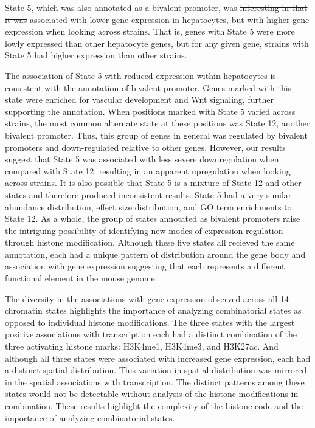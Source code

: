 \documentclass[
  11pt,
]{article}
\providecommand{\DIFaddtex}[1]{{\protect\color{blue}\uwave{#1}}} %
\providecommand{\DIFdeltex}[1]{{\protect\color{red}\sout{#1}}}                      %
\providecommand{\DIFaddbegin}{} %
\providecommand{\DIFaddend}{} %
\providecommand{\DIFdelbegin}{} %
\providecommand{\DIFdelend}{} %
\providecommand{\DIFadd}[1]{\texorpdfstring{\DIFaddtex{#1}}{#1}} %
\providecommand{\DIFdel}[1]{\texorpdfstring{\DIFdeltex{#1}}{}} %
\newcommand{\DIFscaledelfig}{0.5}
\newlength{\DIFdelgraphicswidth} %
\newlength{\DIFdelgraphicsheight} %
\newcommand{\DIFaddincludegraphics}[2][]{{\color{blue}\fbox{\DIFOincludegraphics[#1]{#2}}}} %
\newcommand{\DIFdelincludegraphics}[2][]{%
\sbox{\DIFdelgraphicsbox}{\DIFOincludegraphics[#1]{#2}}%
\settoboxwidth{\DIFdelgraphicswidth}{\DIFdelgraphicsbox} %
\settoboxtotalheight{\DIFdelgraphicsheight}{\DIFdelgraphicsbox} %
\scalebox{\DIFscaledelfig}{%
\parbox[b]{\DIFdelgraphicswidth}{\usebox{\DIFdelgraphicsbox}\\[-\baselineskip] \rule{\DIFdelgraphicswidth}{0em}}\llap{\resizebox{\DIFdelgraphicswidth}{\DIFdelgraphicsheight}{%
\setlength{\unitlength}{\DIFdelgraphicswidth}%
\begin{picture}(1,1)%
\thicklines\linethickness{2pt} %
{\color[rgb]{1,0,0}\put(0,0){\framebox(1,1){}}}%
{\color[rgb]{1,0,0}\put(0,0){\line( 1,1){1}}}%
{\color[rgb]{1,0,0}\put(0,1){\line(1,-1){1}}}%
\end{picture}%
}\hspace*{3pt}}} %
} %
\DeclareRobustCommand{\DIFaddbegin}{\DIFOaddbegin \let\includegraphics\DIFaddincludegraphics} %
\DeclareRobustCommand{\DIFaddend}{\DIFOaddend \let\includegraphics\DIFOincludegraphics} %
\DeclareRobustCommand{\DIFdelbegin}{\DIFOdelbegin \let\includegraphics\DIFdelincludegraphics} %
\DeclareRobustCommand{\DIFdelend}{\DIFOaddend \let\includegraphics\DIFOincludegraphics} %
\begin{document}
State 5, which was also annotated as a bivalent promoter, was \DIFdelbegin \DIFdel{interesting in that it was }\DIFdelend associated
with lower gene expression in hepatocytes, but with higher gene
expression when looking across strains. That is, genes with State 5 were
more lowly expressed than other hepatocyte genes, but for any given
gene, strains with State 5 had higher expression than other strains.

The association of State 5 with reduced expression within hepatocytes is
consistent with the annotation of bivalent promoter. Genes marked with
this state were enriched for vascular development and Wnt signaling,
further supporting the annotation. When positions marked with State 5
varied across strains, the most common alternate state at these
positions was State 12, another bivalent promoter. Thus, this group of
genes in general was regulated by bivalent promoters and down-regulated
relative to other genes. However, our results suggest that State 5 was
associated with less severe \DIFdelbegin \DIFdel{downregulation }\DIFdelend \DIFaddbegin \DIFadd{down-regulation }\DIFaddend when compared with State 12,
resulting in an apparent \DIFdelbegin \DIFdel{upregulation }\DIFdelend \DIFaddbegin \DIFadd{up-regulation }\DIFaddend when looking across strains. It
is also possible that State 5 is a mixture of State 12 and other states
and therefore produced inconsistent results. State 5 had a very similar
abundance distribution, effect size distribution, and GO term
enrichments to State 12. As a whole, the group of states annotated as
bivalent promoters raise the intriguing possibility of identifying new
modes of expression regulation through histone modification. Although
these five states all recieved the same annotation, each had a unique
pattern of distribution around the gene body and association with gene
expression suggesting that each represents a different functional
element in the mouse genome.

The diversity in the associations with gene expression observed across
all 14 chromatin states highlights the importance of analyzing
combinatorial states as opposed to individual histone modifications. The
three states with the largest positive associations with transcription
each had a distinct combination of the three activating histone marks:
H3K4me1, H3K4me3, and H3K27ac. And although all three states were
associated with increased gene expression, each had a distinct spatial
distribution. This variation in spatial distribution was mirrored in the
spatial associations with transcription. The distinct patterns among
these states would not be detectable without analysis of the histone
modifications in combination. These results highlight the complexity of
the histone code and the importance of analyzing combinatorial states.
\end{document}
